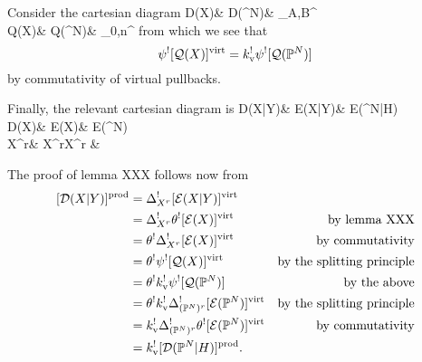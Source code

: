 Consider the cartesian diagram
\bcd
\mathcal D(X)\ar[r]\ar[d,"\varphi_X"] & \mathcal D(\PP^N)\ar[r]\ar[d,"\varphi_{\PP^N}"] & \MM_{A,B}^{}\ar[d,"\psi"] \\
\mathcal Q(X)\ar[r,"k"] & \mathcal Q(\PP^N)\ar[r] & \MM_{0,n}^{}
\ecd
from which we see that
\[
 \psi^![\mathcal Q(X)]^{\operatorname{virt}}=k_{\text{v}}^!\psi^![\mathcal Q(\mathbb P^N)]
\]
by commutativity of virtual pullbacks.

Finally, the relevant cartesian diagram is
\bcd
\mathcal D(X|Y)\ar[d]\ar[r] & \mathcal E(X|Y)\ar[d]\ar[r] & \mathcal E(\PP^N|H)\ar[d,"\theta"] \\
\mathcal D(X)\ar[d]\ar[r] & \mathcal E(X)\ar[d]\ar[r] & \mathcal E(\PP^N) \\
X^r\ar[r,"\Delta_{X^r}"] & X^r\times X^r & {}
\ecd

The proof of lemma XXX follows now from
\begin{align*} [\mathcal D(X|Y)]^{\operatorname{prod}} & = \Delta_{X^r}^! [\mathcal E(X|Y)]^{\operatorname{virt}} & \\
& =  \Delta_{X^r}^! \theta^![\mathcal E(X)]^{\operatorname{virt}} & \text{by lemma XXX} \\
& =  \theta^!\Delta_{X^r}^! [\mathcal E(X)]^{\operatorname{virt}} & \text{by commutativity} \\
& =  \theta^!\psi^![\mathcal Q(X)]^{\operatorname{virt}} & \text{by the splitting principle} \\
& =  \theta^!k_{\text{v}}^!\psi^![\mathcal Q(\mathbb P^N)] & \text{by the above} \\
& =  \theta^!k_{\text{v}}^!\Delta_{(\mathbb P^N)^r}^![\mathcal E(\mathbb P^N)]^{\operatorname{virt}} & \text{by the splitting principle} \\
& =  k_{\text{v}}^!\Delta_{(\mathbb P^N)^r}^!\theta^![\mathcal E(\mathbb P^N)]^{\operatorname{virt}} & \text{by commutativity} \\
& =  k_{\text{v}}^![\mathcal D(\mathbb P^N|H)]^{\operatorname{prod}}.
\end{align*}
